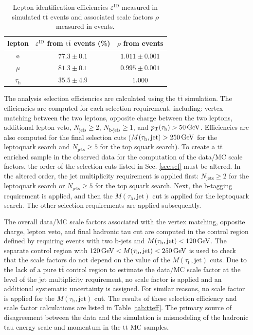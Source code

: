 \documentclass[12pt]{thesis}  %
\newcommand{\tauh}{\ensuremath{\tau_{\text{h}}}\xspace}
\newcommand{\Pe}{\ensuremath{\cmsSymbolFace{e}}\xspace}
\renewcommand{\ttbar}{\ensuremath{\mathrm{t}\overline{\mathrm{t}}}\xspace}
\def\MassTJ{\ensuremath{M(\tauh,\text{jet})}\xspace}
\begin{document}
\begin{table}
  \begin{center}
    \begin{tabular}{|c|c|c|}
      \hline
      lepton & $\varepsilon^{\text{ID}}$ from \ttbar events (\%) & $\rho$ from \Z events \\
      \hline\hline
      \Pe     & $77.3 \pm 0.1$ & $1.011 \pm 0.001$ \\
      $\mu$   & $81.3 \pm 0.1$ & $0.995 \pm 0.001$ \\
      $\tauh$ & $35.5 \pm 4.9$ & $1.000\vphantom{{}\pm0.001}$ \\
      \hline
    \end{tabular}
    \caption{Lepton identification efficiencies $\varepsilon^{\text{ID}}$ measured in simulated \ttbar events and associated scale factors $\rho$ measured in \Z events.}
    \label{tab:ttlepeff}
  \end{center}
\end{table}

The analysis selection efficiencies are calculated using the \ttbar simulation. The efficiencies are computed for each selection requirement, including: vertex matching between the two leptons, opposite charge between the two leptons, additional lepton veto, $N_{\text{jets}}\geq2$, $N_{\text{b-jets}}\geq1$, and $\pt(\tauh)>50\GeV$. Efficiencies are also computed for the final selection cuts ($\MassTJ>250\GeV$ for the leptoquark search and $N_{\text{jets}}\geq5$ for the top squark search). To create a \ttbar enriched sample in the observed data for the computation of the data/MC scale factors, the order of the selection cuts listed in Sec. \ref{sec:sel} must be altered. In the altered order, the jet multiplicity requirement is applied first: $N_{\text{jets}}\geq2$ for the leptoquark search or $N_{\text{jets}}\geq5$ for the top squark search. Next, the b-tagging requirement is applied, and then the \MassTJ cut is applied for the leptoquark search. The other selection requirements are applied subsequently.

The overall data/MC scale factors associated with the vertex matching, opposite charge, lepton veto, and final hadronic tau \pt cut are computed in the control region defined by requiring events with two b-jets and $\MassTJ<120\GeV$. The separate control region with $120\GeV < \MassTJ < 250\GeV$ is used to check that the scale factors do not depend on the value of the $\MassTJ$ cuts. Due to the lack of a pure \ttbar control region to estimate the data/MC scale factor at the level of the jet multiplicity requirement, no scale factor is applied and an additional systematic uncertainty is assigned. For similar reasons, no scale factor is applied for the \MassTJ cut. The results of these selection efficiency and scale factor calculations are listed in Table \ref{tab:tteff}. The primary source of disagreement between the data and the simulation is mismodeling of the hadronic tau energy scale and momentum in the \ttbar MC samples.
\end{document}

